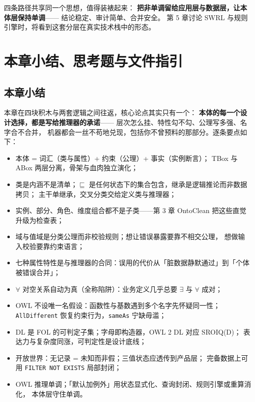 四条路径共享同一个思想，值得装裱起来：
\textbf{把非单调留给应用层与数据层，让本体层保持单调}——
结论稳定、审计简单、合并安全。
第 5 章讨论 SWRL 与规则引擎时，将看到这套分层在真实技术栈中的形态。

\section{本章小结、思考题与文件指引}

\subsection{本章小结}

本章在四块积木与两套逻辑之间往返，核心论点其实只有一个：
\textbf{本体的每一个设计选择，都是写给推理器的承诺}——
层次怎么挂、特性勾不勾、公理写多强、名字合不合并，
机器都会一丝不苟地兑现，包括你不曾预料的那部分。逐条要点如下：

\begin{itemize}
\item 本体 = 词汇（类与属性）+ 约束（公理）+ 事实（实例断言）；
      TBox 与 ABox 两层分离，骨架与血肉独立演化；
\item 类是内涵不是清单；\(\sqsubseteq\) 是任何状态下的集合包含，继承是逻辑推论而非数据拷贝；
      主干单继承，交叉分类交给定义类与推理器；
\item 实例、部分、角色、维度组合都不是子类——第 3 章 OntoClean 把这些直觉升级为检查表；
\item 域与值域是分类公理而非校验规则；想让错误暴露要靠不相交公理，
      想做输入校验要靠约束语言；
\item 七种属性特性是与推理器的合同：误用的代价从「脏数据静默通过」到「个体被错误合并」；
\item \(\forall\) 对空关系自动为真（全称陷阱）：业务定义几乎总要 \(\exists\) 与 \(\forall\) 成对；
\item OWL 不设唯一名假设：函数性与基数遇到多个名字先怀疑同一性；
      \texttt{AllDifferent} 恢复约束行为，\texttt{sameAs} 宁缺毋滥；
\item DL 是 FOL 的可判定子集；字母即构造器，OWL 2 DL 对应 SROIQ(D)；
      表达力与复杂度同涨，可判定性是设计底线；
\item 开放世界：无记录 = 未知而非假；三值状态应透传到产品层；
      完备数据上可用 \texttt{FILTER NOT EXISTS} 局部封闭；
\item OWL 推理单调；「默认加例外」用状态显式化、查询封闭、规则引擎或重算消化，
      本体层守住单调。
\end{itemize}

